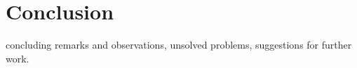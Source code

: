 \chapter{Conclusion}
    concluding remarks and observations, unsolved problems, suggestions for further work.
